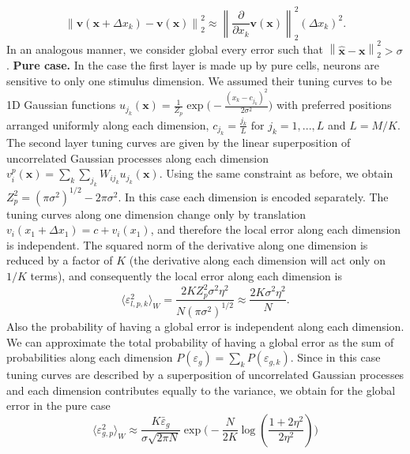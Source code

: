 \documentclass[a4paper]{article}%
\begin{document}
\begin{equation}
\left\|  \mathbf{v}(\mathbf{x} + \Delta x_{k}) - \mathbf{v}(\mathbf{x}%
)\right\| _{2}^{2} \approx\left\|  \frac{\partial}{\partial x_{k}}%
\mathbf{v}(\mathbf{x})\right\| _{2}^{2} (\Delta x_{k})^{2}.
\end{equation}
In an analogous manner, we consider global every error such that $\left\|
\hat{\mathbf{x}}-\mathbf{x}\right\| _{2}^{2} > \sigma$. \newline%
\newline\textbf{Pure case.} In the case the first layer is made up by pure
cells, neurons are sensitive to only one stimulus dimension. We assumed their
tuning curves to be 1D Gaussian functions \newline$u_{j_{k}}(\mathbf{x}) =
\frac{1}{Z_{p}} \exp\Big(-\frac{(x_{k} - c_{j_{k}})^{2}}{2\sigma^{2}}\Big)$
with preferred positions arranged uniformly along each dimension, $c_{j_{k}} =
\frac{j_{k}}{L} \text{ for } j_{k}=1,...,L $ and $L=M/K$. The second layer
tuning curves are given by the linear superposition of uncorrelated Gaussian
processes along each dimension $v_{i}^{p}(\mathbf{x}) = \sum_{k} \sum_{j_{k}%
}W_{ij_{k}} u_{j_{k}}(\mathbf{x}).$ Using the same constraint as before, we
obtain $Z_{p}^{2} = (\pi\sigma^{2})^{1/2} - 2\pi\sigma^{2}$. In this case each
dimension is encoded separately. The tuning curves along one dimension change
only by translation $v_{i}(x_{1} + \Delta x_{1}) = c + v_{i}(x_{1})$, and
therefore the local error along each dimension is independent. The squared
norm of the derivative along one dimension is reduced by a factor of $K$ (the
derivative along each dimension will act only on $1/K$ terms), and
consequently the local error along each dimension is
\begin{equation}
\langle\varepsilon_{l,p,k}^{2}\rangle_{W} = \frac{2 K Z_{p}^{2} \sigma^{2}
\eta^{2}}{N (\pi\sigma^{2})^{1/2}} \approx\frac{2 K \sigma^{2} \eta^{2}}{N}.
\end{equation}
Also the probability of having a global error is independent along each
dimension. We can approximate the total probability of having a global error
as the sum of probabilities along each dimension $P(\varepsilon_{g}) =
\sum_{k} P(\varepsilon_{g,k})$. Since in this case tuning curves are described
by a superposition of uncorrelated Gaussian processes and each dimension
contributes equally to the variance, we obtain for the global error in the
pure case
\begin{equation}
\langle\varepsilon_{g,p} ^{2} \rangle_{W} \approx\frac{K\bar{\varepsilon}_{g}%
}{\sigma\sqrt{2\pi N}} \exp{\Big(-\frac{N}{2K} \log(\frac{1+2\eta^{2}}%
{2\eta^{2}})\Big)}%
\end{equation}
\end{document}
